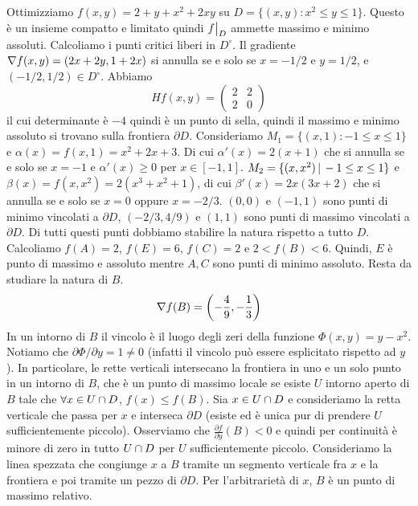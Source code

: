 \documentclass[a4paper]{article}
\begin{document}
\begin{snippetexample}{}
    Ottimizziamo \(f(x,y) = 2 + y + x^2 + 2xy\) su
    \(D = \{(x,y) \colon x^2 \leq y \leq 1\}\). Questo è un insieme compatto
    e limitato quindi \(\restr{f}{D}\) ammette massimo e minimo assoluti.
    Calcoliamo i punti critici liberi in \(D^\circ\).
    Il gradiente \(\nabla f(x,y) = (2x + 2y, 1 + 2x)\) si annulla
    se e solo se \(x=-1/2\) e \(y = 1/2\), e \((-1/2, 1/2) \in D^\circ\).
    Abbiamo
    \[
        Hf(x,y) = \begin{pmatrix}
            2 & 2 \\ 2 & 0
        \end{pmatrix}
    \]
    il cui determinante è \(-4\) quindi è un punto di sella, quindi il massimo
    e minimo assoluto si trovano sulla frontiera \(\partial D\).
    Consideriamo \(M_1 = \{(x,1) \colon -1 \leq x \leq 1\}\) e
    \(\alpha(x) = f(x,1) = x^2 + 2x + 3\).
    Di cui \(\alpha'(x) = 2(x+1)\) che si annulla se e solo se \(x=-1\)
    e \(\alpha'(x) \geq 0\) per \(x\in[-1,1]\).
    \(M_2 = \{(x,x^2) \,|\, -1 \leq x \leq 1\}\) e
    \(\beta(x) = f(x,x^2) = 2(x^3 + x^2 + 1)\), di cui
    \(\beta'(x) = 2x(3x+2)\) che si annulla se e solo se \(x=0\) oppure \(x = -2/3\).
    \((0,0)\) e \((-1, 1)\) sono punti di minimo vincolati a \(\partial D\),
    \((-2/3, 4/9)\) e \((1,1)\) sono punti di massimo vincolati a \(\partial D\).
    Di tutti questi punti dobbiamo stabilire la natura rispetto a tutto \(D\).
    Calcoliamo \(f(A) = 2\), \(f(E) = 6\), \(f(C)=2\) e \(2 < f(B) < 6\).
    Quindi, \(E\) è punto di massimo e assoluto mentre \(A,C\) sono punti di minimo assoluto.
    Resta da studiare la natura di \(B\).
    \[
        \nabla f(B) = \left(- \frac49, -\frac13\right)
    \]
    In un intorno di \(B\) il vincolo è il luogo degli zeri della funzione
    \(\Phi(x,y) = y-x^2\). Notiamo che \(\partial \Phi / \partial y = 1 \neq 0\)
    (infatti il vincolo può essere esplicitato rispetto ad \(y\)).
    In particolare, le rette verticali intersecano la frontiera in uno e un solo punto
    in un intorno di \(B\), che è un punto di massimo locale se esiste \(U\) intorno aperto di \(B\)
    tale che \(\forall x \in U \cap D\), \(f(x) \leq f(B)\).
    Sia \(x \in U \cap D\) e consideriamo la retta verticale che passa per \(x\)
    e interseca \(\partial D\) (esiste ed è unica pur di prendere \(U\) sufficientemente piccolo).
    Osserviamo che \(\frac{\partial f}{\partial y}(B) < 0\) e quindi
    per continuità è minore di zero in tutto \(U \cap D\) per \(U\) sufficientemente piccolo.
    Consideriamo la linea spezzata che congiunge \(x\) a \(B\) tramite un segmento verticale fra
    \(x\) e la frontiera e poi tramite un pezzo di \(\partial D\). Per l'arbitrarietà di \(x\), \(B\)
    è un punto di massimo relativo. %
\end{snippetexample}
\end{document}
